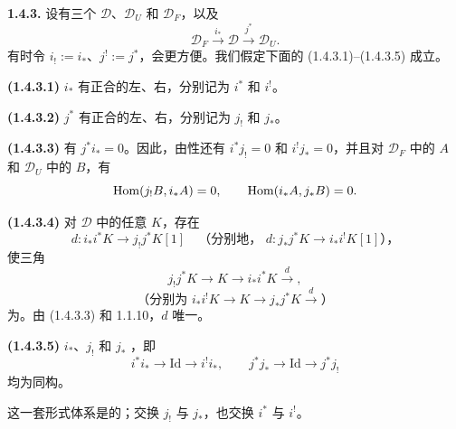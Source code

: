 \par\medskip\noindent\textbf{1.4.3.}
设有三个 $\mathcal D$、$\mathcal D_U$ 和 $\mathcal D_F$，以及
\[
\mathcal D_F\xrightarrow{i_*}\mathcal D\xrightarrow{j^*}\mathcal D_U.
\]
有时令 $i_!:=i_*$、$j^!:=j^*$，会更方便。我们假定下面的 (1.4.3.1)--(1.4.3.5) 成立。

\par\medskip\noindent\textbf{(1.4.3.1)} $i_*$ 有正合的左、右，分别记为 $i^*$ 和 $i^!$。

\par\medskip\noindent\textbf{(1.4.3.2)} $j^*$ 有正合的左、右，分别记为 $j_!$ 和 $j_*$。

\par\medskip\noindent\textbf{(1.4.3.3)} 有 $j^*i_*=0$。因此，由性还有 $i^*j_!=0$ 和 $i^!j_*=0$，并且对 $\mathcal D_F$ 中的 $A$ 和 $\mathcal D_U$ 中的 $B$，有
\[
\operatorname{Hom}(j_!B,i_*A)=0,\qquad\operatorname{Hom}(i_*A,j_*B)=0.
\]
\par\medskip\noindent\textbf{(1.4.3.4)} 对 $\mathcal D$ 中的任意 $K$，存在
\[
d:i_*i^*K\longrightarrow j_!j^*K[1]
\quad\text{（分别地， }d:j_*j^*K\longrightarrow i_*i^!K[1]\text{），}
\]
使三角
\[
j_!j^*K\longrightarrow K\longrightarrow i_*i^*K\xrightarrow{d},
\]
\[
\text{（分别为 }i_*i^!K\longrightarrow K\longrightarrow j_*j^*K\xrightarrow{d}\text{）}
\]
为。由 (1.4.3.3) 和 1.1.10，$d$ 唯一。

\par\medskip\noindent\textbf{(1.4.3.5)} $i_*$、$j_!$ 和 $j_*$ ，即
\[
i^*i_*\longrightarrow\mathrm{Id}\longrightarrow i^!i_*,
\qquad j^*j_*\longrightarrow\mathrm{Id}\longrightarrow j^*j_!
\]
均为同构。

这一套形式体系是的；交换 $j_!$ 与 $j_*$，也交换 $i^*$ 与 $i^!$。

